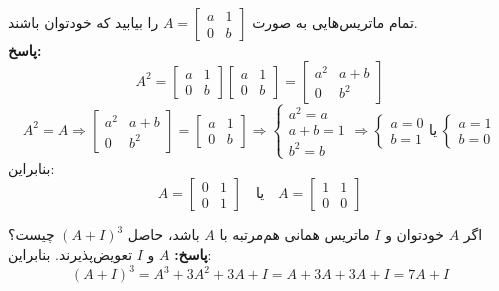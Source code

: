 \begin{example}
	تمام ماتریس‌هایی به صورت
	$A=
	\begin{bmatrix}
		a & 1 \\
		0 & b
	\end{bmatrix}$
	را بیابید که خودتوان باشند. \\
	\textbf{پاسخ:}
	\[
	A^2=
	\begin{bmatrix}
		a & 1 \\
		0 & b
	\end{bmatrix}
	\begin{bmatrix}
		a & 1 \\
		0 & b
	\end{bmatrix}
	=
	\begin{bmatrix}
		a^2 & a+b \\
		0 & b^2
	\end{bmatrix}
	\]
	\[
	A^2=A \Rightarrow
	\begin{bmatrix}
		a^2 & a+b \\
		0 & b^2
	\end{bmatrix}
	=
	\begin{bmatrix}
		a & 1 \\
		0 & b
	\end{bmatrix}
	\Rightarrow
	\begin{cases}
		a^2=a \\
		a+b=1 \\
		b^2=b
	\end{cases}
	\Rightarrow
	\begin{cases}
		a=0 \\
		b=1
	\end{cases}
	\text{یا} \
	\begin{cases}
		a=1 \\
		b=0
	\end{cases}
	\]
	بنابراین:
	\[
	A=
	\begin{bmatrix}
		0 & 1 \\
		0 & 1
	\end{bmatrix}
	\quad \text{یا} \quad
	A=
	\begin{bmatrix}
		1 & 1 \\
		0 & 0
	\end{bmatrix}
	\]
\end{example}

\begin{example}
	اگر $A$ خودتوان و $I$ ماتریس همانی هم‌مرتبه با $A$ باشد، حاصل
	$(A+I)^3$
	چیست؟ \\
	\textbf{پاسخ:}
	$A$ و $I$
	تعویض‌پذیرند. بنابراین:
	$$(A+I)^3 = A^3 + 3A^2 + 3A + I = A + 3A + 3A + I = 7A + I$$
\end{example}

